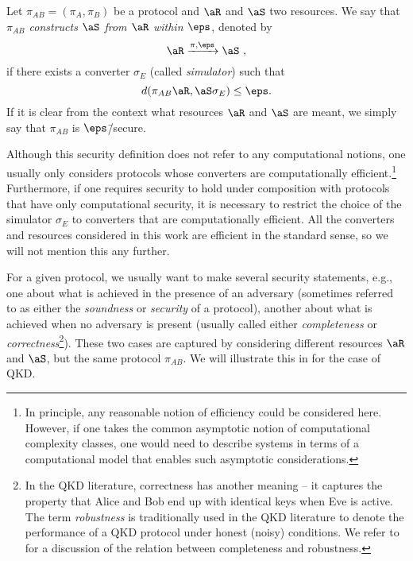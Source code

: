 \begin{deff} \label{def:security}
  Let $\pi_{AB} = (\pi_A,\pi_B)$ be a protocol and $\aR$ and $\aS$ two
   resources.  We say that \emph{$\pi_{AB}$ constructs $\aS$
    from $\aR$ within $\eps$}, denoted by
  \[ 
    \aR \xrightarrow{\pi,\eps} \aS \ ,
  \]
  if there exists a converter $\sigma_E$ (called \emph{simulator})
  such that
   \begin{equation} \label{eq:def.sec} d(\pi_{AB}\aR,\aS\sigma_E) \leq
     \eps.\end{equation} If it is clear from the context what
   resources $\aR$ and $\aS$ are meant, we simply say that $\pi_{AB}$
   is $\eps$\=/secure.
\end{deff}

Although this security definition does not refer to any computational
notions, one usually only considers protocols whose converters are
computationally efficient.\footnote{In principle, any reasonable
  notion of efficiency could be considered here. However, if one takes
  the common asymptotic notion of computational complexity classes,
  one would need to describe systems in terms of a computational model
  that enables such asymptotic considerations.}  Furthermore, if one
requires security to hold under composition with protocols that have
only computational security, it is necessary to restrict the choice of
the simulator $\sigma_E$ to converters that are computationally
efficient.  All the converters and resources considered in this work
are efficient in the standard sense, so we will not mention this any
further.

For a given protocol, we usually want to make several security
statements, e.g., one about what is achieved in the presence of an
adversary (sometimes referred to as either the \emph{soundness} or
\emph{security} of a protocol), another about what is achieved when no
adversary is present (usually called either \emph{completeness} or
\emph{correctness}\footnote{In the QKD literature, correctness has
  another meaning \--- it captures the property that Alice and Bob end
  up with identical keys when Eve is active. The term
  \emph{robustness} is traditionally used in the QKD literature to
  denote the performance of a QKD protocol under honest (noisy)
  conditions. We refer to  for a discussion
  of the relation between completeness and robustness.}). These two
cases are captured by considering different resources $\aR$ and $\aS$,
but the same protocol $\pi_{AB}$. We will illustrate this in
 for the case of QKD.

